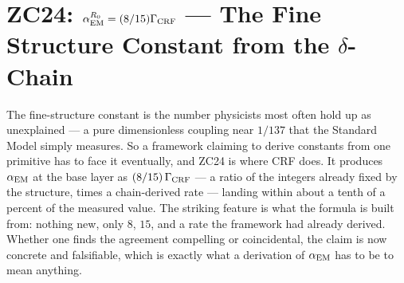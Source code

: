 \documentclass[12pt, a4paper]{article}
\begin{document}
\bigskip



\section{ZC24: $\alpha_{\rm EM}^{R_0} = (8/15)\Gamma_{\rm CRF}$ --- The Fine Structure Constant from the $\delta$-Chain}
\label{sec:zc24-alpha-em}

The fine-structure constant is the number physicists most often hold up as
unexplained --- a pure dimensionless coupling near $1/137$ that the Standard
Model simply measures. So a framework claiming to derive constants from one
primitive has to face it eventually, and ZC24 is where CRF does. It produces
$\alpha_{\rm EM}$ at the base layer as $(8/15)\,\Gamma_{\rm CRF}$ --- a ratio of
the integers already fixed by the structure, times a chain-derived rate ---
landing within about a tenth of a percent of the measured value. The striking
feature is what the formula is built from: nothing new, only $8$, $15$, and a
rate the framework had already derived. Whether one finds the agreement
compelling or coincidental, the claim is now concrete and falsifiable, which is
exactly what a derivation of $\alpha_{\rm EM}$ has to be to mean anything.

\end{document}
